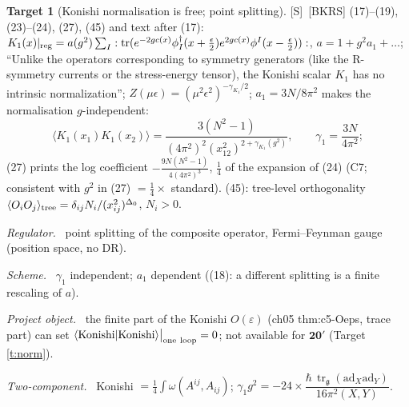 \documentclass[11pt]{article}
\theoremstyle{definition}
\newtheorem{target}{Target}
\newcommand{\tr}{\operatorname{tr}}
\newcommand{\Sl}{\textup{[S]}}
\newcommand{\unit}{\dfrac{\hbar\,\tr_{\mathfrak g}(\mathrm{ad}_X\mathrm{ad}_Y)}{16\pi^2(X,Y)}}
\newcommand{\oneloop}{\big|_{\rm one\ loop}}
\newcommand{\fld}[1]{\par\textit{#1.}\ }
\begin{document}
\begin{target}[Konishi normalisation is free; point splitting]\label{t:bkrs}
\Sl\ [BKRS] (17)--(19), (23)--(24), (27), (45) and text after (17): $K_1(x)|_{\rm reg}=a(g^2)\sum_I:\tr(e^{-2gc(x)}\phi_I^\dagger(x+\tfrac\epsilon2)e^{2gc(x)}\phi^I(x-\tfrac\epsilon2)):$, $a=1+g^2a_1+\dots$; ``Unlike the operators corresponding to symmetry generators (like the R-symmetry currents or the stress-energy tensor), the Konishi scalar $K_1$ has no intrinsic normalization''; $Z(\mu\epsilon)=(\mu^2\epsilon^2)^{-\gamma_{K_1}/2}$; $a_1=3N/8\pi^2$ makes the normalisation $g$-independent:
\[
\langle K_1(x_1)K_1(x_2)\rangle=\frac{3(N^2-1)}{(4\pi^2)^2(x_{12}^2)^{2+\gamma_{K_1}(g^2)}},\qquad\gamma_1=\frac{3N}{4\pi^2};
\]
(27) prints the log coefficient $-\frac{9N(N^2-1)}{4(4\pi^2)^3}$, $\tfrac14$ of the expansion of (24) (C7; consistent with $g^2$ in (27) $=\tfrac14\times$ standard). (45): tree-level orthogonality $\langle O_iO_j\rangle_{\rm tree}=\delta_{ij}N_i/(x_{ij}^2)^{\Delta_0}$, $N_i>0$.
\fld{Regulator} point splitting of the composite operator, Fermi--Feynman gauge (position space, no DR).
\fld{Scheme} $\gamma_1$ independent; $a_1$ dependent ((18): a different splitting is a finite rescaling of $a$).
\fld{Project object} the finite part of the Konishi $O(\varepsilon)$ (ch05 thm:c5-Oeps, trace part) can set $\langle\text{Konishi}|\text{Konishi}\rangle\oneloop=0$; not available for $\mathbf{20'}$ (Target \ref{t:norm}).
\fld{Two-component} Konishi $=\tfrac14\int\omega(A^{ij},A_{ij})$; $\gamma_1g^2=-24\times\unit$.
\end{target}
\end{document}
